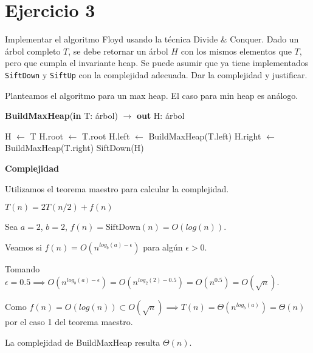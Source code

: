 \section*{Ejercicio 3}

Implementar el algoritmo Floyd usando la técnica Divide \& Conquer. Dado un árbol completo $T$, se debe retornar un árbol $H$ con los mismos elementos que $T$, pero que cumpla el invariante heap. Se puede asumir que ya tiene implementados \lstinline{SiftDown} y \lstinline{SiftUp} con la complejidad adecuada. Dar la complejidad y justificar.

Planteamos el algoritmo para un max heap. El caso para min heap es análogo.

\begin{algorithm}[H]
\caption{
    \textbf{BuildMaxHeap}(\textbf{in} T: árbol) $\to$ \textbf{out} H: árbol
}
\begin{algorithmic}[1]
        \State H $\gets$ T 
    \Else
        \State H.root $\gets$ T.root
        \State H.left $\gets$ BuildMaxHeap(T.left)
        \State H.right $\gets$ BuildMaxHeap(T.right)
        \State SiftDown(H) 
    \EndIf
\end{algorithmic}
\end{algorithm}

\textbf{Complejidad}

Utilizamos el teorema maestro para calcular la complejidad.

$T(n) = 2T(n/2) + f(n)$

Sea $a=2$, $b=2$, $f(n) = \text{SiftDown}(n) = O(log(n))$.

Veamos si $f(n) = O(n^{log_b(a) - \epsilon})$ para algún $\epsilon > 0$.

Tomando $\epsilon = 0.5 \implies O(n^{log_b(a) - \epsilon}) = O(n^{log_2(2) - 0.5}) = O(n^{0.5}) = O(\sqrt{n})$.

Como $f(n) = O(log(n)) \subset O(\sqrt{n}) \implies T(n) = \Theta(n^{log_b(a)}) = \Theta(n)$ por el caso 1 del teorema maestro.

La complejidad de BuildMaxHeap resulta $\Theta(n)$.
